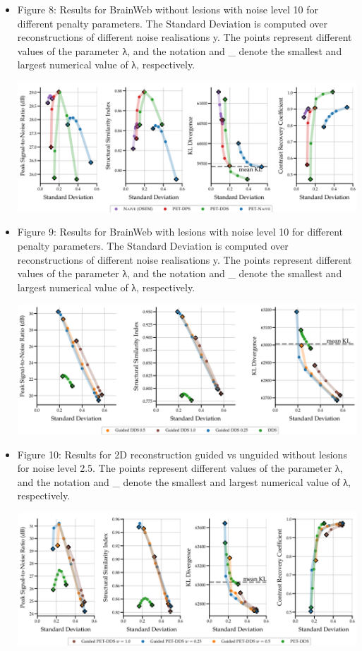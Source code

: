 \documentclass{article}
\begin{document}
\begin{itemize}
\item 
Figure 8: Results for BrainWeb without lesions with noise level 10 for different penalty parameters. The Standard Deviation is computed over reconstructions of different noise realisations y. The points represent different values of the parameter λ, and the notation and \_ denote the smallest and largest numerical value of λ, respectively.

\includegraphics{_page_32_Figure_3.png}


\item 
Figure 9: Results for BrainWeb with lesions with noise level 10 for different penalty parameters. The Standard Deviation is computed over reconstructions of different noise realisations y. The points represent different values of the parameter λ, and the notation and \_ denote the smallest and largest numerical value of λ, respectively.

\includegraphics{_page_33_Figure_1.png}


\item 
Figure 10: Results for 2D reconstruction guided vs unguided without lesions for noise level 2.5. The points represent different values of the parameter λ, and the notation and \_ denote the smallest and largest numerical value of λ, respectively.

\includegraphics{_page_33_Figure_3.png}



\end{itemize}
\end{document}
